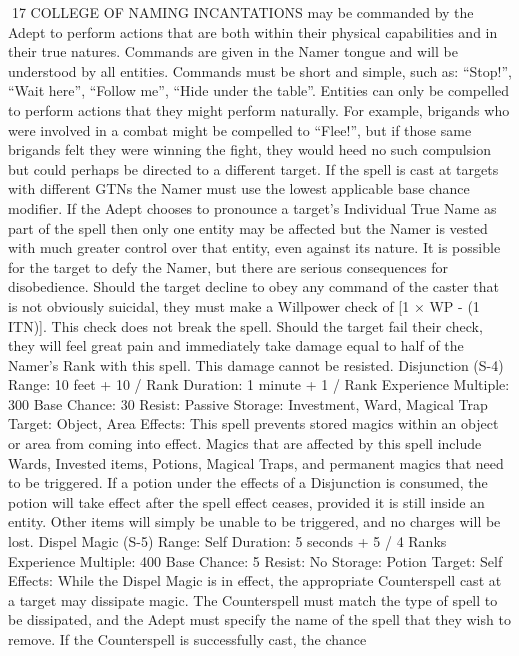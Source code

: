 \documentclass[a4paper]{article}
\begin{document}
\begin{multicols}{3}
17 COLLEGE OF NAMING INCANTATIONS
may be commanded by the Adept to perform actions that are both within their physical capabilities
and in their true natures. Commands are given in
the Namer tongue and will be understood by all
entities. Commands must be short and simple, such
as: “Stop!”, “Wait here”, “Follow me”, “Hide
under the table”. Entities can only be compelled to
perform actions that they might perform naturally.
For example, brigands who were involved in a
combat might be compelled to “Flee!”, but if those
same brigands felt they were winning the fight,
they would heed no such compulsion but could
perhaps be directed to a different target. If the spell
is cast at targets with different GTNs the Namer
must use the lowest applicable base chance modifier.
If the Adept chooses to pronounce a target’s Individual True Name as part of the spell then only one
entity may be affected but the Namer is vested with
much greater control over that entity, even against
its nature. It is possible for the target to defy the
Namer, but there are serious consequences for
disobedience. Should the target decline to obey any
command of the caster that is not obviously suicidal, they must make a Willpower check of [1 × WP
- (1%
ITN)]. This check does not break the spell. Should
the target fail their check, they will feel great pain
and immediately take damage equal to half of the
Namer’s Rank with this spell. This damage cannot
be resisted.
Disjunction (S-4)
Range: 10 feet + 10 / Rank
Duration: 1 minute + 1 / Rank
Experience Multiple: 300
Base Chance: 30%
Resist: Passive
Storage: Investment, Ward, Magical Trap
Target: Object, Area
Effects: This spell prevents stored magics within an
object or area from coming into effect. Magics that
are affected by this spell include Wards, Invested
items, Potions, Magical Traps, and permanent
magics that need to be triggered. If a potion under
the effects of a Disjunction is consumed, the potion
will take effect after the spell effect ceases, provided it is still inside an entity. Other items will
simply be unable to be triggered, and no charges
will be lost.
Dispel Magic (S-5)
Range: Self
Duration: 5 seconds + 5 / 4 Ranks
Experience Multiple: 400
Base Chance: 5%
Resist: No
Storage: Potion
Target: Self
Effects: While the Dispel Magic is in effect, the
appropriate Counterspell cast at a target may dissipate magic. The Counterspell must match the type
of spell to be dissipated, and the Adept must specify the name of the spell that they wish to remove.
If the Counterspell is successfully cast, the chance

\end{multicols}
\end{document}
